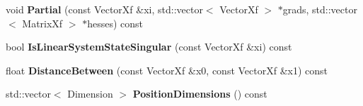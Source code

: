 \begin{DoxyCompactItemize}
\item 
void {\bfseries Partial} (const Vector\+Xf \&xi, std\+::vector$<$ Vector\+Xf $>$ $\ast$grads, std\+::vector$<$ Matrix\+Xf $>$ $\ast$hesses) const \hypertarget{classilqgames_1_1_single_player_flat_car6_d_a0b6f26a37091274148c0ff247d13a84b}{}\label{classilqgames_1_1_single_player_flat_car6_d_a0b6f26a37091274148c0ff247d13a84b}

\item 
bool {\bfseries Is\+Linear\+System\+State\+Singular} (const Vector\+Xf \&xi) const \hypertarget{classilqgames_1_1_single_player_flat_car6_d_a7e885c06c72f40ca7a2174cc61850fc3}{}\label{classilqgames_1_1_single_player_flat_car6_d_a7e885c06c72f40ca7a2174cc61850fc3}

\item 
float {\bfseries Distance\+Between} (const Vector\+Xf \&x0, const Vector\+Xf \&x1) const \hypertarget{classilqgames_1_1_single_player_flat_car6_d_afe249fbf6ebdb0449e4d11fd521c10e6}{}\label{classilqgames_1_1_single_player_flat_car6_d_afe249fbf6ebdb0449e4d11fd521c10e6}

\item 
std\+::vector$<$ Dimension $>$ {\bfseries Position\+Dimensions} () const \hypertarget{classilqgames_1_1_single_player_flat_car6_d_a88e9b3edc25fd0846ecf3bf29ff5bd81}{}\label{classilqgames_1_1_single_player_flat_car6_d_a88e9b3edc25fd0846ecf3bf29ff5bd81}

\end{DoxyCompactItemize}

